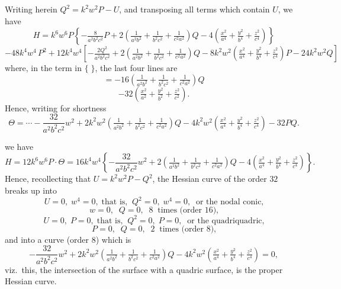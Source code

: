 \documentclass[11pt,a4paper]{article}
\begin{document}
Writing herein $Q^{2} = k^{2}w^{2}P - U$, and transposing all terms which contain $U$, we have
\[
H = k^{6}w^{6}P\left\{-\tfrac{8}{a^{2}b^{2}c^{2}}P + 2\left(\tfrac{1}{a^{2}b^{2}} + \tfrac{1}{b^{2}c^{2}} + \tfrac{1}{c^{2}a^{2}}\right)Q - 4\left(\tfrac{x^{2}}{a^{4}} + \tfrac{y^{2}}{b^{4}} + \tfrac{z^{2}}{c^{4}}\right)\right\}
\]
\[
- 48k^{4}w^{4}\,P^{2} + 12k^{4}w^{4}\left[-\tfrac{2Q^{2}}{a^{2}b^{2}c^{2}} + 2\left(\tfrac{1}{a^{2}b^{2}} + \tfrac{1}{b^{2}c^{2}} + \tfrac{1}{c^{2}a^{2}}\right)Q - 8k^{2}w^{2}\left(\tfrac{x^{2}}{a^{4}} + \tfrac{y^{2}}{b^{4}} + \tfrac{z^{2}}{c^{4}}\right)P - 24k^{2}w^{2}Q\right]
\]
where, in the term in $\{\;\}$, the last four lines are
\[
= -16\left(\tfrac{1}{a^{2}b^{2}} + \tfrac{1}{b^{2}c^{2}} + \tfrac{1}{c^{2}a^{2}}\right)Q
\]
\[
- 32\left(\tfrac{x^{2}}{a^{2}} + \tfrac{y^{2}}{b^{2}} + \tfrac{z^{2}}{c^{2}}\right).
\]
Hence, writing for shortness
\[
\Theta = \cdots - \frac{32}{a^{2}b^{2}c^{2}}w^{2} + 2k^{2}w^{2}\left(\tfrac{1}{a^{2}b^{2}} + \tfrac{1}{b^{2}c^{2}} + \tfrac{1}{c^{2}a^{2}}\right)Q - 4k^{2}w^{2}\left(\tfrac{x^{2}}{a^{4}} + \tfrac{y^{2}}{b^{4}} + \tfrac{z^{2}}{c^{4}}\right) - 32PQ.
\]

\newpage


\noindent we have
\[
H = 12 k^{6} w^{6} P \cdot \Theta = 16 k^{4} w^{4}\left\{-\frac{32}{a^{2}b^{2}c^{2}}w^{2} + 2\left(\tfrac{1}{a^{2}b^{2}} + \tfrac{1}{b^{2}c^{2}} + \tfrac{1}{c^{2}a^{2}}\right)Q - 4\left(\tfrac{x^{2}}{a^{4}} + \tfrac{y^{2}}{b^{4}} + \tfrac{z^{2}}{c^{4}}\right)\right\}.
\]
Hence, recollecting that $U = k^{2}w^{2}P - Q^{2}$, the Hessian curve of the order $32$ breaks up into
\[
U = 0,\; w^{4} = 0,\; \text{that is,}\;\; Q^{2} = 0,\; w^{4} = 0,\;\; \text{or the nodal conic,}
\]
\[
w = 0,\;\; Q = 0,\;\; 8\;\;\text{times (order 16),}
\]
\[
U = 0,\; P = 0,\; \text{that is,}\;\; Q^{2} = 0,\; P = 0,\;\; \text{or the quadriquadric,}
\]
\[
P = 0,\;\; Q = 0,\;\; 2\;\;\text{times (order 8),}
\]
and into a curve (order $8$) which is
\[
-\frac{32}{a^{2}b^{2}c^{2}}w^{2} + 2k^{2}w^{2}\left(\tfrac{1}{a^{2}b^{2}} + \tfrac{1}{b^{2}c^{2}} + \tfrac{1}{c^{2}a^{2}}\right)Q - 4k^{2}w^{2}\left(\tfrac{x^{2}}{a^{4}} + \tfrac{y^{2}}{b^{4}} + \tfrac{z^{2}}{c^{4}}\right) = 0,
\]
viz.\ this, the intersection of the surface with a quadric surface, is the proper Hessian curve.

\newpage

\end{document}
